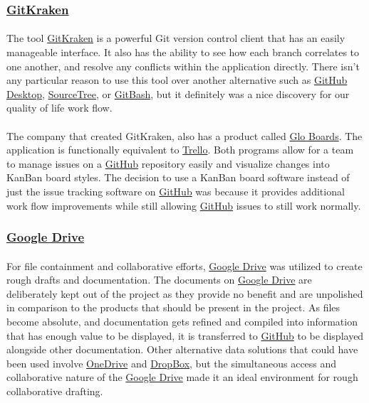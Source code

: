\documentclass[12pt]{article}
\begin{document}
\subsubsection{\href{https://www.gitkraken.com/}{GitKraken}}
\paragraph{}	The tool \href{https://www.gitkraken.com/}{GitKraken} is a powerful Git version control client that has an easily manageable interface. It also has the ability to see how each branch correlates to one another, and resolve any conflicts within the application directly. There isn't any particular reason to use this tool over another alternative such as \href{https://desktop.github.com/}{GitHub Desktop}, \href{https://www.sourcetreeapp.com/}{SourceTree}, or \href{https://gitforwindows.org/}{GitBash}, but it definitely was a nice discovery for our quality of life work flow. 

\paragraph{} The company that created GitKraken, also has a product called \href{https://www.gitkraken.com/glo}{Glo Boards}. The application is functionally equivalent to \href{https://trello.com/en}{Trello}. Both programs allow for a team to manage issues on a \href{https://github.com}{GitHub} repository easily and visualize changes into KanBan board styles. The decision to use a KanBan board software instead of just the issue tracking software on \href{https://github.com}{GitHub} was because it provides additional work flow improvements while still allowing \href{https://github.com}{GitHub} issues to still work normally.

\subsubsection{\href{https://drive.google.com}{Google Drive}}
\paragraph{}	For file containment and collaborative efforts, \href{https://drive.google.com}{Google Drive} was utilized to create rough drafts and documentation. The documents on \href{https://drive.google.com}{Google Drive} are deliberately kept out of the project as they provide no benefit and are unpolished in comparison to the products that should be present in the project. As files become absolute, and documentation gets refined and compiled into information that has enough value to be displayed, it is transferred to \href{https://github.com}{GitHub} to be displayed alongside other documentation. Other alternative data solutions that could have been used involve \href{https://onedrive.live.com/}{OneDrive} and \href{https://dropbox.com}{DropBox}, but the simultaneous access and collaborative nature of the \href{https://drive.google.com}{Google Drive} made it an ideal environment for rough collaborative drafting. 
\end{document}
